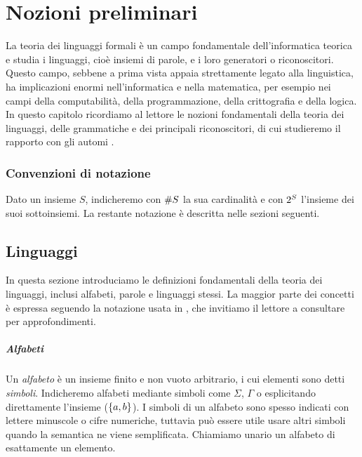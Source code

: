 \chapter{Nozioni preliminari}
La teoria dei linguaggi formali è un campo fondamentale dell'informatica teorica e studia i linguaggi, cioè insiemi di parole, e i loro generatori o riconoscitori. Questo campo, sebbene a prima vista appaia strettamente legato alla linguistica, ha implicazioni enormi nell'informatica e nella matematica, per esempio nei campi della computabilità, della programmazione, della crittografia e della logica. In questo capitolo ricordiamo al lettore le nozioni fondamentali della teoria dei linguaggi, delle grammatiche e dei principali riconoscitori, di cui studieremo il rapporto con gli automi .


\subsection*{Convenzioni di notazione}
Dato un insieme $S$, indicheremo con $\# S$ la sua cardinalità e con $2^{S}$ l'insieme dei suoi sottoinsiemi.
La restante notazione è descritta nelle sezioni seguenti.


\section{Linguaggi}
In questa sezione introduciamo le definizioni fondamentali della teoria dei linguaggi, inclusi alfabeti, parole e linguaggi stessi. La maggior parte dei concetti è espressa seguendo la notazione usata in \cite{Hopcroft:79:introLFA}, che invitiamo il lettore a consultare per approfondimenti.

\paragraph{Alfabeti} Un \emph{alfabeto} è un insieme finito e non vuoto arbitrario, i cui elementi sono detti \emph{simboli}. Indicheremo alfabeti mediante simboli come $\Sigma$, $\Gamma$ o esplicitando direttamente l'insieme ($\left\{ a,b \right\}$). I simboli di un alfabeto sono spesso indicati con lettere minuscole o cifre numeriche, tuttavia può essere utile usare altri simboli quando la semantica ne viene semplificata. Chiamiamo unario un alfabeto di esattamente un elemento.

